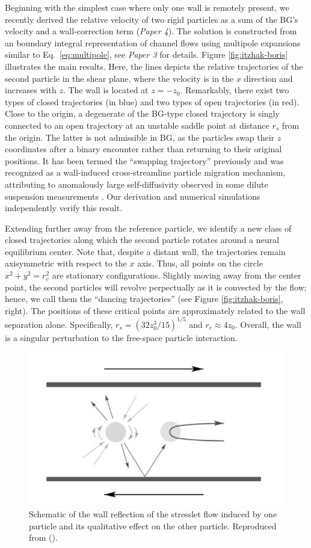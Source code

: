 Beginning with the simplest case where only one wall is remotely present, we recently derived the relative velocity of two rigid particles as a sum of the BG's velocity and a wall-correction term (\emph{Paper 4}). The solution is constructed from an boundary integral representation of channel flows using multipole expansions similar to Eq.\ \eqref{eq:multipole}, see \emph{Paper 3} for details.
Figure \ref{fig:itzhak-boris} illustrates the main results.
Here, the lines depicts the relative trajectories of the second particle in the shear plane, where the velocity is in the $x$ direction and increases with $z$. The wall is located at $z=-z_0$.
Remarkably, there exist two types of closed trajectories (in blue) and two types of open trajectories (in red).
Close to the origin, a degenerate of the BG-type closed trajectory is singly connected to an open trajectory at an unstable saddle point at distance $r_s$ from the origin.
The latter is not admissible in BG, as the particles swap their $z$ coordinates after a binary encounter rather than returning to their original positions.
It has been termed the ``swapping trajectory'' previously and was recognized as a wall-induced cross-streamline particle migration mechanism, attributing to anomalously large self-diffusivity observed in some dilute suspension measurements \citep{Zarraga_Leighton2002, zurita-gotor_2007}.
Our derivation and numerical simulations independently verify this result.

Extending further away from the reference particle, we identify a new class of closed trajectories along which the second particle rotates around a neural equilibrium center. Note that, despite a distant wall, the trajectories remain axisymmetric with respect to the $x$ axis. Thus, all points on the circle $x^2+y^2=r_c^2$ are stationary configurations.
Slightly moving away from the center point, the second particles will revolve perpectually as it is convected by the flow; hence, we call them the ``dancing trajectories'' (see Figure \ref{fig:itzhak-boris}, right).
The positions of these critical points are approximately related to the wall separation alone. Specifically, $r_s=(32z_0^3/15)^{1/5}$ and $r_c \approx 4z_0$.
Overall, the wall is a singular perturbation to the free-space particle interaction.

\begin{figure}%
  \centering
  \includegraphics[width=0.55\columnwidth]{stresslet_reflection.png}
  \caption{Schematic of the wall reflection of the stresslet flow induced by one particle and its qualitative effect on the other particle. Reproduced from \cite{zurita-gotor_2007} ().}
  \label{fig:stresslet-refl}
\end{figure}

